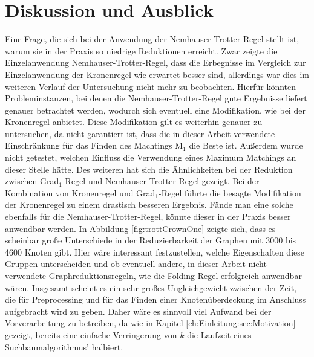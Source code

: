 
\chapter{Diskussion und Ausblick}
\label{ch:fazit}

Eine Frage, die sich bei der Anwendung der Nemhauser-Trotter-Regel stellt ist, warum sie in der Praxis so niedrige Reduktionen erreicht. Zwar zeigte die Einzelanwendung Nemhauser-Trotter-Regel, dass die Erbegnisse im Vergleich zur Einzelanwendung der Kronenregel wie erwartet besser sind, allerdings war dies im weiteren Verlauf der Untersuchung nicht mehr zu beobachten. Hierfür könnten Probleminstanzen, bei denen die Nemhauser-Trotter-Regel gute Ergebnisse liefert genauer betrachtet werden, wodurch sich eventuell eine Modifikation, wie bei der Kronenregel anbietet. Diese Modifikation gilt es weiterhin genauer zu untersuchen, da nicht garantiert ist, dass die in dieser Arbeit verwendete Einschränkung für das Finden des Machtings M$_{1}$ die Beste ist. Außerdem wurde nicht getestet, welchen Einfluss die Verwendung eines Maximum Matchings an dieser Stelle hätte. Des weiteren hat sich die Ähnlichkeiten bei der Reduktion zwischen Grad$_{1}$-Regel und Nemhauser-Trotter-Regel gezeigt. Bei der Kombination von Kronenregel und Grad$_{1}$-Regel führte die besagte Modifikation der Kronenregel zu einem drastisch besseren Ergebnis. Fände man eine solche ebenfalls für die Nemhauser-Trotter-Regel, könnte dieser in der Praxis besser anwendbar werden.
In Abbildung \ref{fig:trottCrownOne} zeigte sich, dass es scheinbar große Unterschiede in der Reduzierbarkeit der Graphen mit 3000 bis 4600 Knoten gibt. Hier wäre interessant festzustellen, welche Eigenschaften diese Gruppen unterscheiden und ob eventuell andere, in dieser Arbeit nicht verwendete Graphreduktionsregeln, wie die Folding-Regel erfolgreich anwendbar wären. Insgesamt scheint es ein sehr großes Ungleichgewicht zwischen der Zeit, die für Preprocessing und für das Finden einer Knotenüberdeckung im Anschluss aufgebracht wird zu geben. Daher wäre es sinnvoll viel Aufwand bei der Vorverarbeitung zu betreiben, da wie in Kapitel \ref{ch:Einleitung:sec:Motivation} gezeigt, bereits eine einfache Verringerung von $k$ die Laufzeit eines Suchbaumalgorithmus' halbiert.


